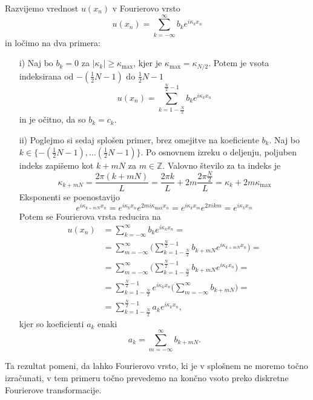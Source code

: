 \documentclass[mat2, tisk]{fmfdelo}
\newcommand{\Z}{\mathbb Z}
\begin{document}
\begin{dokaz}
Razvijemo vrednost $u(x_n)$ v Fourierovo vrsto 
$$
u(x_n) = \sum_{k=-\infty}^{\infty} b_k e^{i\kappa_k x_n}
$$
in ločimo na dva primera: \\
\begin{enumerate}
  \item[i)] Naj bo $b_k = 0$ za $|\kappa_k| \geq \kappa_{\text{max}}$, kjer je 
  $\kappa_{\text{max}} = \kappa_{N/2}$. Potem je vsota indeksirana od 
  $-(\frac{1}{2}N - 1)$ do $\frac{1}{2}N - 1$
  $$
  u(x_n) = \sum_{k=1-\frac{N}{2}}^{\frac{N}{2}-1} b_k e^{i\kappa_k x_n}
  $$
  in je očitno, da so $b_k = c_k$. 
  \item[ii)] Poglejmo si sedaj splošen primer, brez omejitve na koeficiente 
  $b_k$. Naj bo $k \in \{-(\frac{1}{2}N - 1), \dots (\frac{1}{2}N - 1)\}$. 
  Po osnovnem izreku o deljenju, poljuben indeks zapišemo kot
  $k + mN$ za $m\in \Z$. Valovno število za ta indeks je 
  $$
  \kappa_{k + mN} = \frac{2\pi (k + mN)}{L} = \frac{2\pi k}{L} + 2m\frac{2\pi \frac{N}{2}}{L} = \kappa_k + 2m \kappa_{\text{max}}
  $$
  Eksponenti se poenostavijo 
  $$
  e^{i \kappa_{k + mN} x_n} =  e^{i \kappa_{k} x_n}  e^{2mi\kappa_{\text{max}} x_n} = 
  e^{i\kappa_k x_m} e^{2\pi i k m} = e^{i\kappa_k x_m}
  $$
  Potem se Fourierova vrsta reducira na 
  \begin{align*}
  u(x_n) &= \sum_{k=-\infty}^{\infty} b_k e^{i\kappa_k x_n} = \\
         &= \sum_{m=-\infty}^{\infty} \Big(\sum_{k=1-\frac{N}{2}}^{\frac{N}{2}-1} b_{k+mN} e^{i\kappa_{k+mN} x_n}\Big) =\\ 
         &= \sum_{m=-\infty}^{\infty} \Big(\sum_{k=1-\frac{N}{2}}^{\frac{N}{2}-1} b_{k+mN} e^{i\kappa_{k} x_n}\Big) =\\ 
         &= \sum_{k=1-\frac{N}{2}}^{\frac{N}{2}-1} e^{i\kappa_{k} x_n}\Big(\sum_{m=-\infty}^{\infty} b_{k+mN}\Big) =\\
         &= \sum_{k=1-\frac{N}{2}}^{\frac{N}{2}-1} a_k e^{i\kappa_{k} x_n},
\end{align*}
kjer so koeficienti $a_k$ enaki 
$$a_k = \sum_{m=-\infty}^{\infty} b_{k+mN}.$$
\end{enumerate}
\end{dokaz}

Ta rezultat pomeni, da lahko Fourierovo vrsto, ki je v splošnem ne moremo 
točno izračunati, v tem primeru točno prevedemo na končno vsoto preko 
diskretne Fourierove transformacije. \\
\end{document}
